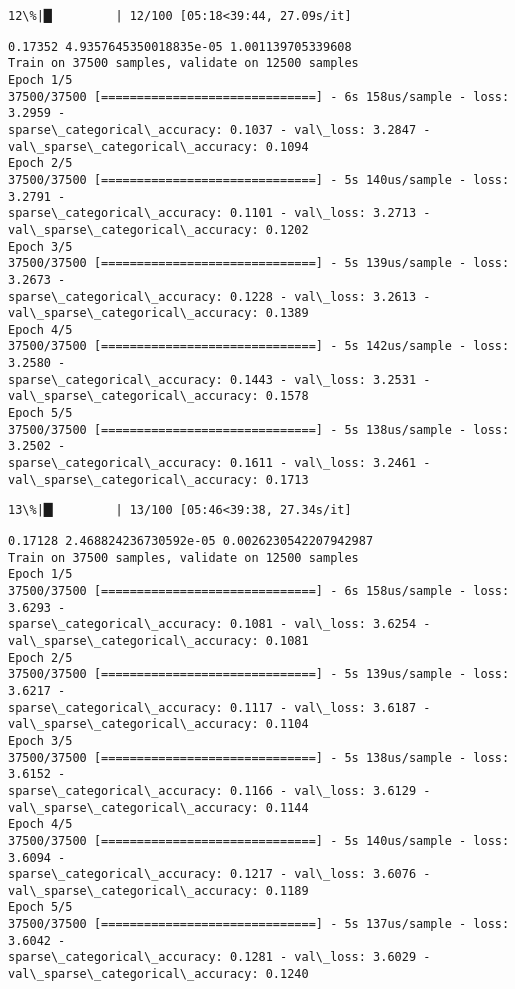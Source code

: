 \documentclass[11pt]{article}
\begin{document}
    \begin{Verbatim}[commandchars=\\\{\}]
 12\%|█▏        | 12/100 [05:18<39:44, 27.09s/it]
    \end{Verbatim}

    \begin{Verbatim}[commandchars=\\\{\}]
0.17352 4.9357645350018835e-05 1.001139705339608
Train on 37500 samples, validate on 12500 samples
Epoch 1/5
37500/37500 [==============================] - 6s 158us/sample - loss: 3.2959 -
sparse\_categorical\_accuracy: 0.1037 - val\_loss: 3.2847 -
val\_sparse\_categorical\_accuracy: 0.1094
Epoch 2/5
37500/37500 [==============================] - 5s 140us/sample - loss: 3.2791 -
sparse\_categorical\_accuracy: 0.1101 - val\_loss: 3.2713 -
val\_sparse\_categorical\_accuracy: 0.1202
Epoch 3/5
37500/37500 [==============================] - 5s 139us/sample - loss: 3.2673 -
sparse\_categorical\_accuracy: 0.1228 - val\_loss: 3.2613 -
val\_sparse\_categorical\_accuracy: 0.1389
Epoch 4/5
37500/37500 [==============================] - 5s 142us/sample - loss: 3.2580 -
sparse\_categorical\_accuracy: 0.1443 - val\_loss: 3.2531 -
val\_sparse\_categorical\_accuracy: 0.1578
Epoch 5/5
37500/37500 [==============================] - 5s 138us/sample - loss: 3.2502 -
sparse\_categorical\_accuracy: 0.1611 - val\_loss: 3.2461 -
val\_sparse\_categorical\_accuracy: 0.1713
    \end{Verbatim}

    \begin{Verbatim}[commandchars=\\\{\}]
 13\%|█▎        | 13/100 [05:46<39:38, 27.34s/it]
    \end{Verbatim}

    \begin{Verbatim}[commandchars=\\\{\}]
0.17128 2.468824236730592e-05 0.0026230542207942987
Train on 37500 samples, validate on 12500 samples
Epoch 1/5
37500/37500 [==============================] - 6s 158us/sample - loss: 3.6293 -
sparse\_categorical\_accuracy: 0.1081 - val\_loss: 3.6254 -
val\_sparse\_categorical\_accuracy: 0.1081
Epoch 2/5
37500/37500 [==============================] - 5s 139us/sample - loss: 3.6217 -
sparse\_categorical\_accuracy: 0.1117 - val\_loss: 3.6187 -
val\_sparse\_categorical\_accuracy: 0.1104
Epoch 3/5
37500/37500 [==============================] - 5s 138us/sample - loss: 3.6152 -
sparse\_categorical\_accuracy: 0.1166 - val\_loss: 3.6129 -
val\_sparse\_categorical\_accuracy: 0.1144
Epoch 4/5
37500/37500 [==============================] - 5s 140us/sample - loss: 3.6094 -
sparse\_categorical\_accuracy: 0.1217 - val\_loss: 3.6076 -
val\_sparse\_categorical\_accuracy: 0.1189
Epoch 5/5
37500/37500 [==============================] - 5s 137us/sample - loss: 3.6042 -
sparse\_categorical\_accuracy: 0.1281 - val\_loss: 3.6029 -
val\_sparse\_categorical\_accuracy: 0.1240
    \end{Verbatim}
\end{document}
